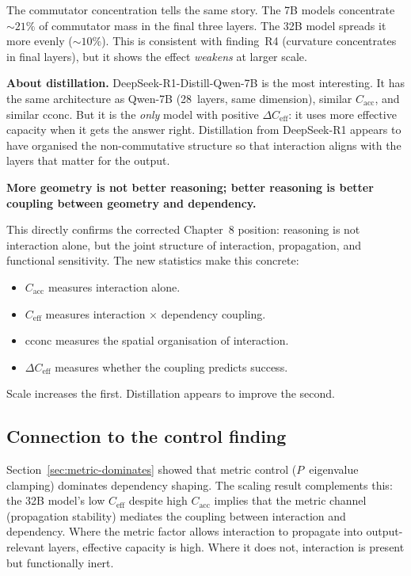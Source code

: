 \documentclass[11pt, twoside, openright]{memoir}
\begin{document}
The commutator concentration tells the same story. The 7B models concentrate
${\sim}21\%$ of commutator mass in the final three layers. The 32B model
spreads it more evenly (${\sim}10\%$). This is consistent with finding~R4
(curvature concentrates in final layers), but it shows the effect
\emph{weakens} at larger scale.

\textbf{About distillation.}
DeepSeek-R1-Distill-Qwen-7B is the most interesting. It has the same
architecture as Qwen-7B (28~layers, same dimension), similar
$C_{\mathrm{acc}}$, and similar $\mathrm{cconc}$. But it is the
\emph{only} model with positive $\Delta C_{\mathrm{eff}}$: it uses more
effective capacity when it gets the answer right. Distillation from
DeepSeek-R1 appears to have organised the non-commutative structure so
that interaction aligns with the layers that matter for the output.

\begin{keyidea}
\textbf{More geometry is not better reasoning; better reasoning is
better coupling between geometry and dependency.}

This directly confirms the corrected Chapter~8 position: reasoning is not
interaction alone, but the joint structure of interaction, propagation, and
functional sensitivity. The new statistics make this concrete:
\begin{itemize}[nosep]
\item $C_{\mathrm{acc}}$ measures interaction alone.
\item $C_{\mathrm{eff}}$ measures interaction $\times$ dependency coupling.
\item $\mathrm{cconc}$ measures the spatial organisation of interaction.
\item $\Delta C_{\mathrm{eff}}$ measures whether the coupling predicts
  success.
\end{itemize}
Scale increases the first. Distillation appears to improve the second.
\end{keyidea}

\subsection{Connection to the control finding}

Section~\ref{sec:metric-dominates} showed that metric control
($P$~eigenvalue clamping) dominates dependency shaping.
The scaling result complements this: the 32B model's low
$C_{\mathrm{eff}}$ despite high $C_{\mathrm{acc}}$ implies that the
metric channel (propagation stability) mediates the coupling between
interaction and dependency. Where the metric factor allows interaction
to propagate into output-relevant layers, effective capacity is high.
Where it does not, interaction is present but functionally inert.
\end{document}
